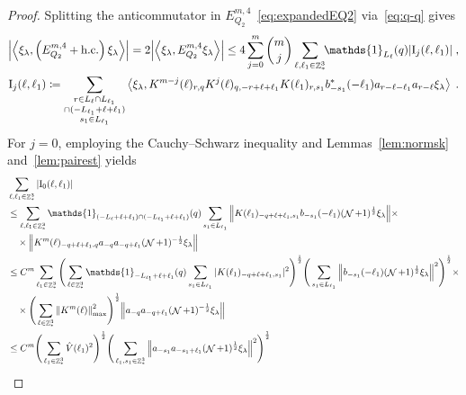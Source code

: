 \documentclass[12pt,a4paper]{article}
\numberwithin{equation}{section}
\newcommand{\1}{\mathbb{I}}
\newcommand{\I}{\mathrm{I}}
\DeclareMathOperator{\Z}{\mathbb{Z}}
\DeclareMathOperator{\NN}{\mathcal{N}}
\newcommand{\half}{\frac{1}{2}}
\newcommand{\eva}[1]{\left\langle #1 \right\rangle}
\theoremstyle{plain}
\theoremstyle{definition}
\theoremstyle{remark}
\theoremstyle{plain}
\theoremstyle{definition}
\theoremstyle{remark}
\begin{document}
\begin{proof}
Splitting the anticommutator in $ E^{m,4}_{Q_2} $~\eqref{eq:expandedEQ2} via~\eqref{eq:q-q} gives
\begin{equation} \label{eq:EQ2171}
\begin{aligned}
	\abs{\eva{\xi_\lambda,\left(E^{m,4}_{Q_2}+\mathrm{h.c.}\right) \xi_\lambda }} 
	= 2\abs{\eva{\xi_\lambda, E^{m,4}_{Q_2} \xi_\lambda }}
	\le 4 \sum_{j=0}^m {{m}\choose j} \sum\limits_{\ell,\ell_1 \in \Z^3_*}\!\! \mathds{1}_{L_\ell}(q) |\I_j(\ell, \ell_1)| \;,\\
	\I_j(\ell, \ell_1)
	\coloneq \sum\limits_{\substack{r\in L_{\ell} \cap L_{\ell_1}\\ \cap (-L_{\ell_1}+\ell+\ell_1)\\ s_1 \in L_{\ell_1}}} 
		\eva{\xi_\lambda, K^{m-j}(\ell)_{r,q} K^{j}(\ell)_{q,-r+\ell+\ell_1} K(\ell_1)_{r,s_1} b^*_{-s_1}(-\ell_1) a_{r-\ell-\ell_1} a_{r-\ell} \xi_\lambda} \;. \\
\end{aligned}
\end{equation}
For $ j = 0 $, employing the Cauchy--Schwarz inequality and Lemmas~\ref{lem:normsk} and~\ref{lem:pairest} yields 
\textcolor{green!30!black}{
\begin{align}
	&\sum_{\ell,\ell_1 \in \Z^3_*} |\I_0(\ell, \ell_1)| \nonumber\\
	&\leq \sum_{\ell,\ell_1 \in \Z^3_*} \mathds{1}_{(-L_\ell + \ell + \ell_1) \cap (-L_{\ell_1} + \ell + \ell_1)}(q) \sum\limits_{s_1 \in L_{\ell_1}}
		\norm{K(\ell_1)_{-q+\ell+\ell_1,s_1} b_{-s_1}(-\ell_1) (\NN+1)^{\half} \xi_\lambda} \times \nonumber\\
	&\quad \times \norm{ K^m(\ell)_{-q+\ell+\ell_1,q}a_{-q}a_{-q+\ell_1} (\NN+1)^{-\half} \xi_\lambda } \nonumber\\
	&\leq C^m \sum_{\ell_1 \in \Z^3_*}
		\Bigg( \sum_{\ell \in \Z^3_*} \mathds{1}_{-L_{\ell_1} + \ell + \ell_1}(q) \sum\limits_{s_1 \in L_{\ell_1}} |K(\ell_1)_{-q+\ell+\ell_1,s_1}|^2 \Bigg)^{\half}
		\Bigg( \sum\limits_{s_1 \in L_{\ell_1}} \norm{ b_{-s_1}(-\ell_1) (\NN+1)^{\half} \xi_\lambda}^2 \Bigg)^{\half} \times \nonumber\\
	&\quad \times \Bigg( \sum_{\ell \in \Z^3_*} \norm{K^m(\ell)}_{\max}^2 \Bigg)^{\half}
		\norm{a_{-q}a_{-q+\ell_1} (\NN+1)^{-\half} \xi_\lambda } \nonumber\\
	&\leq C^m \Bigg( \sum_{\ell_1 \in \Z^3_*}
		\hat{V}(\ell_1)^2 \Bigg)^{\half}
		\Bigg( \sum_{\ell_1,s_1 \in \Z^3_*} \norm{ a_{-s_1} a_{-s_1+\ell_1} (\NN+1)^{\half} \xi_\lambda}^2 \Bigg)^{\frac 12}

\end{align}}
\end{proof}
\end{document}
